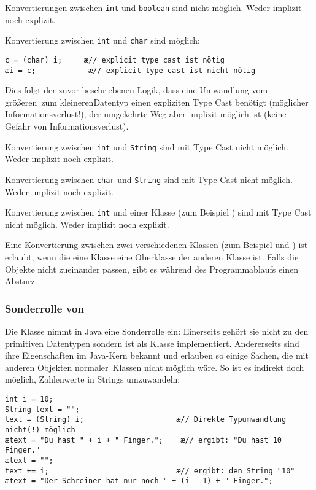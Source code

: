 \begin{compactitem}
\item Konvertierungen zwischen \lstinline|int| und \lstinline|boolean| sind
nicht möglich. Weder implizit noch explizit.

\item Konvertierung zwischen \lstinline|int| und \lstinline|char| sind möglich:

\begin{lstlisting}
c = (char) i;     æ// explicit type cast ist nötig
æi = c;            æ// explicit type cast ist nicht nötig
\end{lstlisting}

Dies folgt der zuvor beschriebenen Logik, dass eine Umwandlung vom \glqq
größeren\grqq\ zum \glqq kleineren\grqq Datentyp einen expliziten Type Cast
benötigt (möglicher Informationsverlust!), der umgekehrte Weg aber implizit
möglich ist (keine Gefahr von Informationsverlust).

\item Konvertierung zwischen \lstinline|int| und \lstinline|String| sind
mit Type Cast nicht möglich. Weder implizit noch explizit.

\item Konvertierung zwischen \lstinline|char| und \lstinline|String| sind
mit Type Cast nicht möglich. Weder implizit noch explizit.

\item Konvertierung zwischen \lstinline|int| und einer Klasse
(zum Beispiel ) sind mit Type Cast nicht möglich. Weder
implizit noch explizit.

\item Eine Konvertierung zwischen zwei verschiedenen Klassen (zum Beispiel
 und ) ist erlaubt, wenn die eine Klasse
eine Oberklasse der anderen Klasse ist. Falls die Objekte nicht zueinander
passen, gibt es während des Programmablaufs einen Absturz.
\end{compactitem}

\subsubsection{Sonderrolle von }

Die Klasse  nimmt in Java eine Sonderrolle ein: Einerseits
gehört sie nicht zu den primitiven Datentypen sondern ist als Klasse
implementiert. Andererseits sind ihre Eigenschaften im Java-Kern bekannt und
erlauben so einige Sachen, die mit anderen Objekten \glqq normaler\grqq\ Klassen
nicht möglich wäre. So ist es indirekt doch möglich, Zahlenwerte in Strings
umzuwandeln:

\begin{lstlisting}
int i = 10;
String text = "";
text = (String) i;                     æ// Direkte Typumwandlung nicht(!) möglich 
ætext = "Du hast " + i + " Finger.";    æ// ergibt: "Du hast 10 Finger."
ætext = "";
text += i;                             æ// ergibt: den String "10"
ætext = "Der Schreiner hat nur noch " + (i - 1) + " Finger.";
\end{lstlisting}
